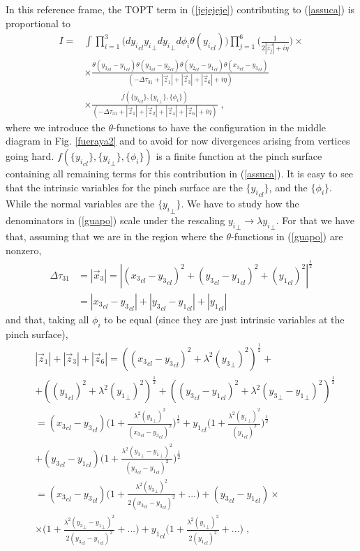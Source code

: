 \documentclass[%
 reprint,
 amsmath,amssymb,
 aps,
]{revtex4-1}
\begin{document}
In this reference frame, the TOPT term in (\ref{jejejeje}) contributing to (\ref{assuca}) is proportional to
\begin{align}
I=&\int \prod_{i=1}^3\Big(d{y_i}_{cl} {y_i}_\perp d{y_i}_\perp d \phi_i\theta({y_i}_{cl})\Big)\prod_{j=1}^6\Big(\frac{1}{2|\vec{z_j}|+i\eta}\Big)\nonumber\times\\
&\times\frac{\theta({y_3}_{cl}-{y_1}_{cl})\theta({y_3}_{cl}-{y_2}_{cl})\theta({y_2}_{cl}-{y_1}_{cl})\theta({x_3}_{cl}-{y_3}_{cl})}{(-\Delta\tau_{31}+|\vec{z}_1|+|\vec{z}_3|+|\vec{z}_6|+i\eta) }\nonumber\\
&\times\frac{f(\{{y_i}_{cl}\},\{{y_i}_\perp\}, \{\phi_i\})}{(-\Delta\tau_{31}+|\vec{z}_1|+|\vec{z}_2|+|\vec{z}_4|+|\vec{z}_6|+i\eta)}\;,\label{guapo}
\end{align}
where we introduce the $\theta$-functions to have the configuration in the middle diagram in Fig. \ref{fueraya2} and to avoid for now divergences arising from vertices going hard. $f(\{{y_i}_{cl}\},\{{y_i}_\perp\}, \{\phi_i\})$ is a finite function at the pinch surface containing all remaining terms for this contribution in (\ref{assuca}). It is easy to see that the intrinsic variables for the pinch surface are the $\{{y_i}_{cl}\}$, and the $\{{\phi_i}\}$. While the normal variables are the $\{{y_i}_{\perp}\}$. We have to study how the denominators in (\ref{guapo}) scale under the rescaling ${y_i}_{\perp}\to\lambda {y_i}_{\perp}$. For that we have that, assuming that we are in the region where the $\theta$-functions in (\ref{guapo}) are nonzero,
\begin{align}
\Delta\tau_{31}&=|\vec{x}_3|=|({x_3}_{cl}-{y_3}_{cl})^2+({y_3}_{cl}-{y_1}_{cl})^2+({y_1}_{cl})^2|^\frac{1}{2}\nonumber\\
&=|{x_3}_{cl}-{y_3}_{cl}|+|{y_3}_{cl}-{y_1}_{cl}|+|{y_1}_{cl}|
\end{align}
and that, taking all $\phi_i$ to be equal (since they are just intrinsic variables at the pinch surface),
\begin{align}
&|\vec{z}_1|+|\vec{z}_3|+|\vec{z}_6|=(({x_3}_{cl}-{y_3}_{cl})^2+\lambda^2({y_3}_\perp)^2)^\frac{1}{2}+\nonumber\\
&+(({y_1}_{cl})^2+\lambda^2({y_1}_\perp)^2)^\frac{1}{2}+(({y_3}_{cl}-{y_1}_{cl})^2+\lambda^2({y_3}_\perp-{y_1}_\perp)^2)^\frac{1}{2}\nonumber\\
&=({x_3}_{cl}-{y_3}_{cl})\Big(1+\frac{\lambda^2({y_3}_\perp)^2}{({x_3}_{cl}-{y_3}_{cl})^2}\Big)^\frac{1}{2}+{y_1}_{cl}\Big(1+\frac{\lambda^2({y_1}_\perp)^2}{({y_1}_{cl})^2}\Big)^\frac{1}{2}\nonumber\\
&+({y_3}_{cl}-{y_1}_{cl})\Big(1+\frac{\lambda^2({y_3}_\perp-{y_1}_\perp)^2}{({y_3}_{cl}-{y_1}_{cl})^2}\Big)^\frac{1}{2}\nonumber\\
&=({x_3}_{cl}-{y_3}_{cl})\Big(1+\frac{\lambda^2({y_3}_\perp)^2}{2({x_3}_{cl}-{y_3}_{cl})^2}+...\Big)+({y_3}_{cl}-{y_1}_{cl})\times\nonumber\\
&\times\Big(1+\frac{\lambda^2({y_3}_\perp-{y_1}_\perp)^2}{2({y_3}_{cl}-{y_1}_{cl})^2}+...\Big)+{y_1}_{cl}\Big(1+\frac{\lambda^2({y_1}_\perp)^2}{2({y_1}_{cl})^2}+...\Big)\;,
\end{align}
\end{document}
